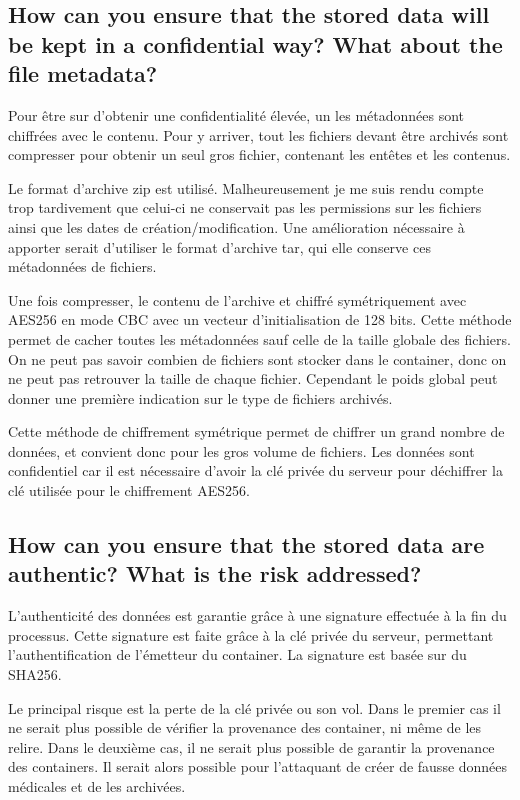\documentclass[a4paper]{report}
\begin{document}
\subsection{How can you ensure that the stored data will be kept in a confidential way? What about the file metadata?}
Pour être sur d'obtenir une confidentialité élevée, un les métadonnées sont chiffrées avec le contenu. Pour y arriver, tout les fichiers devant être archivés sont compresser pour obtenir un seul gros fichier, contenant les entêtes et les contenus.

Le format d'archive zip est utilisé. Malheureusement je me suis rendu compte trop tardivement que celui-ci ne conservait pas les permissions sur les fichiers ainsi que les dates de création/modification. Une amélioration nécessaire à apporter serait d'utiliser le format d'archive tar, qui elle conserve ces métadonnées de fichiers.

Une fois compresser, le contenu de l'archive et chiffré symétriquement avec AES256 en mode CBC avec un vecteur d'initialisation de 128 bits. Cette méthode permet de cacher toutes les métadonnées sauf celle de la taille globale des fichiers. On ne peut pas savoir combien de fichiers sont stocker dans le container, donc on ne peut pas retrouver la taille de chaque fichier. Cependant le poids global peut donner une première indication sur le type de fichiers archivés.

Cette méthode de chiffrement symétrique permet de chiffrer un grand nombre de données, et convient donc pour les gros volume de fichiers. Les données sont confidentiel car il est nécessaire d'avoir la clé privée du serveur pour déchiffrer la clé utilisée pour le chiffrement AES256. 

\subsection{How can you ensure that the stored data are authentic? What is the risk addressed?}
L'authenticité des données est garantie grâce à une signature effectuée à la fin du processus. Cette signature est faite grâce à la clé privée du serveur, permettant l'authentification de l'émetteur du container. La signature est basée sur du SHA256.

Le principal risque est la perte de la clé privée ou son vol. Dans le premier cas il ne serait plus possible de vérifier la provenance des container, ni même de les relire. Dans le deuxième cas, il ne serait plus possible de garantir la provenance des containers. Il serait alors possible pour l'attaquant de créer de fausse données médicales et de les archivées.
\end{document}
